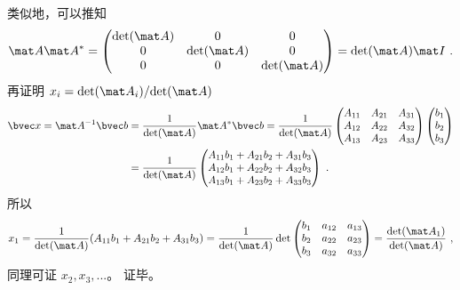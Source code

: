 类似地，可以推知
\begin{equation}
\mat A \mat A^* =
\begin{pmatrix}
\det(\mat A)&0&0\\
0&\det(\mat A)&0\\
0&0&\det(\mat A)\\
\end{pmatrix}
=\det(\mat A) \mat I~.
\end{equation}
再证明 $x_i={\det(\mat A_i)}/{\det(\mat A)}$
\begin{equation}
\begin{aligned}
\bvec x = \mat A^{-1} \bvec b &= \frac{1}{\det(\mat A)}\mat A^* \bvec b = 
\frac{1}{\det(\mat A)}
\begin{pmatrix}
A_{11}&A_{21}&A_{31}\\
A_{12}&A_{22}&A_{32}\\
A_{13}&A_{23}&A_{33}\\
\end{pmatrix}
\begin{pmatrix}
b_1\\
b_2\\
b_3\\
\end{pmatrix}\\
&=
\frac{1}{\det(\mat A)}
\begin{pmatrix}
A_{11}b_1+A_{21}b_2+A_{31}b_3\\
A_{12}b_1+A_{22}b_2+A_{32}b_3\\
A_{13}b_1+A_{23}b_2+A_{33}b_3\\
\end{pmatrix}~.
\end{aligned}
\end{equation}
所以
\begin{equation}
x_1=\frac{1}{\det(\mat A)}(A_{11}b_1+A_{21}b_2+A_{31}b_3)
=\frac{1}{\det(\mat A)}\det
\begin{pmatrix}
b_{1}&a_{12}&a_{13}\\
b_{2}&a_{22}&a_{23}\\
b_{3}&a_{32}&a_{33}\\
\end{pmatrix}
=\frac{\det(\mat A_1)}{\det(\mat A)}~,
\end{equation}
同理可证 $x_2, x_3,...$。 证毕。
